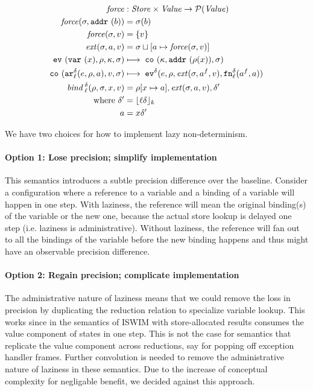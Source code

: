 \documentclass[preprint,onecolumn,9pt]{sigplanconf} %
\begin{document}
\begin{align*}
\force &: \Store \times \Value \to \Set(\Value) \\
\force(\msto,\saddr\maddralt) &= \msto(\maddralt)\\
\force(\msto,\mval) &= \{\mval\} \\
\ext(\msto, \maddr, \mval) &= \msto \sqcup[\maddr \mapsto \force(\msto, \mval)] \\
\ev{\svar{\mvar},\menv,\mkont,\msto} &\machstep\;
\co{\mkont,\saddr{\menv(\mvar)},\msto} \\
\co{\kar[^\mcntr_\mlab]{\mexp,\menv,\maddr},\mval,\msto}
&\machstep\;
\ev[^\mcntr]{\mexp,\menv,\ext(\msto, \maddr^f,\mval),\kfn[^\mcntr_\mlab]{\maddr^f,\maddr}} \\
\mathit{bind\,}^\mcntr_\mlab(\menv,\msto,\mvar,\mval) &= \menv[\mvar \mapsto
  \maddr], \ext(\msto,\maddr, \mval), \mcntr' \\
\mbox{where } \mcntr' &= \lfloor\mlab\mcntr\rfloor_k \\
              \maddr &= \mvar\mcntr'
\end{align*}

We have two choices for how to implement lazy non-determinism.

\paragraph{Option 1: Lose precision; simplify implementation}
This semantics introduces a subtle precision difference over the
baseline. Consider a configuration where a reference to a variable and
a binding of a variable will happen in one step. With laziness, the
reference will mean the original binding(s) of the variable or the new
one, because the actual store lookup is delayed one step
(i.e. laziness is administrative). Without laziness, the reference
will fan out to all the bindings of the variable before the new
binding happens and thus might have an observable precision
difference.

\paragraph{Option 2: Regain precision; complicate implementation}
The administrative nature of laziness means that we could remove the
loss in precision by duplicating the reduction relation to specialize
variable lookup. This works since in the semantics of ISWIM with
store-allocated results consumes the value component of states in one
step. This is not the case for semantics that replicate the value
component across reductions, say for popping off exception handler
frames. Further convolution is needed to remove the administrative
nature of laziness in these semantics. Due to the increase of
conceptual complexity for negligable benefit, we decided against this
approach.
\end{document}
